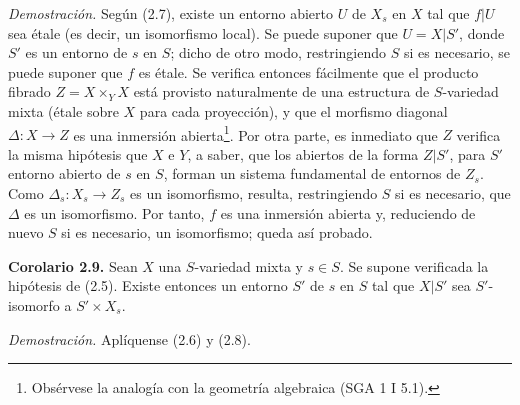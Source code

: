 \emph{Demostración.} Según (2.7), existe un entorno abierto $U$ de $X_s$ en $X$ tal que $f|U$ sea étale (es decir, un isomorfismo local). Se puede suponer que $U=X|S'$, donde $S'$ es un entorno de $s$ en $S$; dicho de otro modo, restringiendo $S$ si es necesario, se puede suponer que $f$ es étale. Se verifica entonces fácilmente que el producto fibrado $Z=X\times_Y X$ está provisto naturalmente de una estructura de $S$-variedad mixta (étale sobre $X$ para cada proyección), y que el morfismo diagonal $\Delta:X\to Z$ es una inmersión abierta\footnote{Obsérvese la analogía con la geometría algebraica (SGA 1 I 5.1).}. Por otra parte, es inmediato que $Z$ verifica la misma hipótesis que $X$ e $Y$, a saber, que los abiertos de la forma $Z|S'$, para $S'$ entorno abierto de $s$ en $S$, forman un sistema fundamental de entornos de $Z_s$. Como $\Delta_s:X_s\to Z_s$ es un isomorfismo, resulta, restringiendo $S$ si es necesario, que $\Delta$ es un isomorfismo. Por tanto, $f$ es una inmersión abierta y, reduciendo de nuevo $S$ si es necesario, un isomorfismo; queda así probado.

\textbf{Corolario 2.9.} Sean $X$ una $S$-variedad mixta y $s\in S$. Se supone verificada la hipótesis de (2.5). Existe entonces un entorno $S'$ de $s$ en $S$ tal que $X|S'$ sea $S'$-isomorfo a $S'\times X_s$.

\emph{Demostración.} Aplíquense (2.6) y (2.8).
